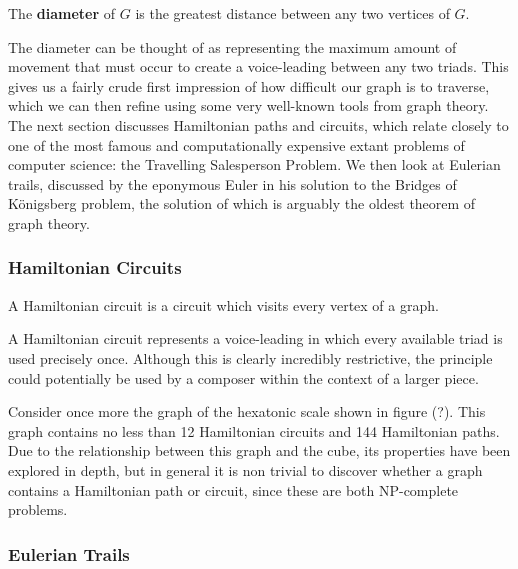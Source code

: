 \documentclass[]{tMAM2e}
\begin{document}
\begin{definition} The \textbf{diameter} of $G$ is the greatest distance between any two vertices of $G$. 
\end{definition}

The diameter can be thought of as representing the maximum amount of movement that must occur to create a voice-leading between any two triads. This gives us a fairly crude first impression of how difficult our graph is to traverse, which we can then refine using some very well-known tools from graph theory. The next section discusses Hamiltonian paths and circuits, which relate closely to one of the most famous and computationally expensive extant problems of computer science: the Travelling Salesperson Problem. We then look at Eulerian trails, discussed by the eponymous Euler in his solution to the Bridges of K\"{o}nigsberg problem, the solution of which is arguably the oldest theorem of graph theory.

\subsubsection{Hamiltonian Circuits}

\begin{definition} A Hamiltonian circuit is a circuit which visits every vertex of a graph.\end{definition}

A Hamiltonian circuit represents a voice-leading in which every available triad is used precisely once. Although this is clearly incredibly restrictive, the principle could potentially be used by a composer within the context of a larger piece.

Consider once more the graph of the hexatonic scale shown in figure (?). This graph contains no less than 12 Hamiltonian circuits and 144 Hamiltonian paths. Due to the relationship between this graph and the cube, its properties have been explored in depth, but in general it is non trivial to discover whether a graph contains a Hamiltonian path or circuit, since these are both NP-complete problems.


\subsubsection{Eulerian Trails}
\end{document}
